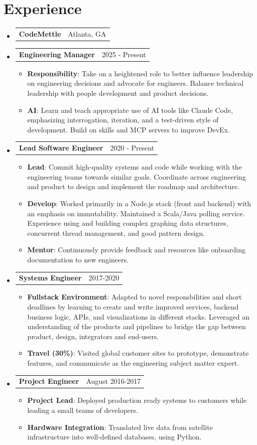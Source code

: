\documentclass[letterpaper,11pt]{article}
\makeatletter
\newcommand{\mytexttilde}{\raisebox{0.5ex}{\texttildelow}}
\newcommand{\resumeSubHeadingListStart}{\begin{itemize}[leftmargin=0.08in, label={}]}
\newcommand{\resumeSubHeadingListEnd}{\end{itemize}}
\newcommand{\resumeItemListStart}{\begin{itemize}[leftmargin=.2in]}
\newcommand{\resumeItemListEnd}{\end{itemize}\vspace{-3pt}}
\newcommand{\resumeItem}[1]{
    \item\normalsize{
       {#1 \vspace{0pt}}
    }
}
\newcommand{\resumeHeading}[2]{
    \vspace{-3pt}\item
    \begin{tabular*}{0.97\textwidth}{l@{\extracolsep{\fill}}r}
      \textbf{#1} & #2
    \end{tabular*}\vspace{-3pt}
}
\newcommand{\resumeSubheading}[2]{
  \vspace{-5pt}\item
    \begin{tabular*}{0.97\textwidth}[t]{l@{\extracolsep{\fill}}r}
      \textbf{#1} & #2
    \end{tabular*}\vspace{-7pt}
}
\newcommand{\boldSubjectWithDesc}[2]{
  \normalsize{\textbf{#1}{: #2 \vspace{-2pt}}}
}
\makeatother
\begin{document}
\section{Experience}
\vspace{2pt}
\resumeSubHeadingListStart
\resumeHeading{\normalsize{CodeMettle}}{\normalsize{Atlanta, GA}}
\resumeSubheading{Engineering Manager}{2025 - Present}
\resumeItemListStart
\resumeItem{
  \boldSubjectWithDesc{Responsibility}{
    Take on a heightened role to better influence leadership on engineering decisions and advocate for engineers.
    Balance technical leadership with people development and product decisions.
  }
}
\resumeItem{
  \boldSubjectWithDesc{AI}{
    Learn and teach appropriate use of AI tools like Claude Code, emphasizing interrogation, iteration, and a test-driven style of development.
    Build on skills and MCP servers to improve DevEx.
  }
}
\resumeItemListEnd
\resumeSubheading{Lead Software Engineer}{2020 - Present}
\resumeItemListStart
\resumeItem{
  \boldSubjectWithDesc{Lead}{
    Commit high-quality systems and code while working with the engineering teams towards similar goals.
    Coordinate across engineering and product to design and implement the roadmap and architecture.
  }
}
\resumeItem{
  \boldSubjectWithDesc{Develop}{
    Worked primarily in a Node.js stack (front and backend) with an emphasis on immutability.
    Maintained a Scala/Java polling service.
    Experience using and building complex graphing data structures, concurrent thread management, and good pattern design.
  }
}
\resumeItem{
  \boldSubjectWithDesc{Mentor}{
    Continuously provide feedback and resources like onboarding documentation to new engineers.
  }
}
\resumeItemListEnd
\resumeSubheading{Systems Engineer}{2017-2020}
\resumeItemListStart
\resumeItem{
  \boldSubjectWithDesc{Fullstack Environment}{
    Adapted to novel responsbilities and short deadlines by learning to create and write improved services, backend business logic, APIs, and visualizations in different stacks.
    Leveraged an understanding of the products and pipelines to bridge the gap between product, design, integrators and end-users.
  }
}
\resumeItem{
  \boldSubjectWithDesc{Travel (\mytexttilde30\%)}{
    Visited global customer sites to prototype, demonstrate features, and communicate as the engineering subject matter expert.
  }
}
\resumeItemListEnd
\resumeSubheading{Project Engineer}{August 2016-2017}
\resumeItemListStart
\resumeItem{
  \boldSubjectWithDesc{Project Lead}{Deployed production ready systems to customers while leading a small teams of developers.}
}
\resumeItem{
  \boldSubjectWithDesc{Hardware Integration}{Translated live data from satellite infrastructure into well-defined databases, using Python.}
}
\resumeItemListEnd
\resumeSubHeadingListEnd
\end{document}
